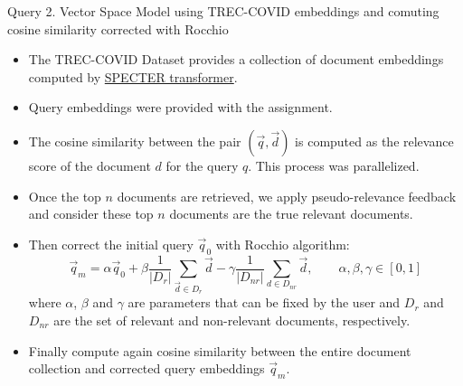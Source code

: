 \documentclass[10pt]{beamer}
\begin{document}
{\begin{frame}{Query 2. Vector Space Model using TREC-COVID embeddings and comuting cosine similarity corrected with Rocchio \cite{salton1990improving}}
    \begin{itemize}
        \item The TREC-COVID Dataset provides a collection of document embeddings computed by \href{https://arxiv.org/abs/2004.07180}{SPECTER transformer}.
        \item Query embeddings were provided with the assignment.
        \item The cosine similarity between the pair $(\vec{q}, \vec{d})$ is computed as the relevance score of the document $d$ for the query $q$. This process was parallelized.
        \item Once the top $n$ documents are retrieved, we apply pseudo-relevance feedback and consider these top $n$ documents are the true relevant documents.
        \item Then correct the initial query $\vec{q}_0$ with Rocchio algorithm:
        \[ \vec{q}_m = \alpha \vec{q}_0 + \beta \frac{1}{|D_r|} \sum_{\vec{d}\in D_r}\vec{d} - \gamma \frac{1}{|D_{nr}|} \sum_{d\in D_{nr}} \vec{d}, \qquad \alpha, \beta, \gamma \in [0,1]\]
        where $\alpha$, $\beta$ and $\gamma$ are parameters that can be fixed by the user and $D_r$ and $D_{nr}$ are the set of relevant and non-relevant documents, respectively.
        \item Finally compute again cosine similarity between the entire document collection and corrected query embeddings $\vec{q}_m$.
    \end{itemize}
\end{frame}

}
\end{document}
